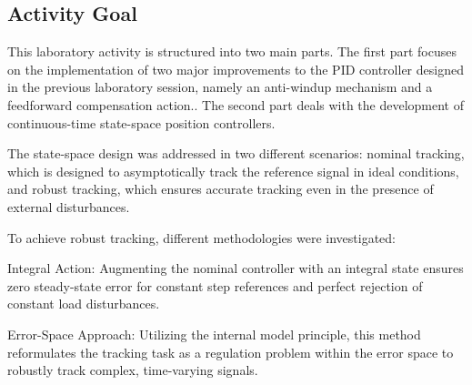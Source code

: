 \subsection{Activity Goal}
This laboratory activity is structured into two main parts. The first part focuses on the implementation of two major improvements to the PID controller designed in the previous laboratory session, namely an anti-windup mechanism and a feedforward compensation action.. The second part deals with the development of continuous-time state-space position controllers.

The state-space design was addressed in two different scenarios: nominal tracking, which is designed to asymptotically track the reference signal in ideal conditions, and robust tracking, which ensures accurate tracking even in the presence of external disturbances.

To achieve robust tracking, different methodologies were investigated:

Integral Action: Augmenting the nominal controller with an integral state ensures zero steady-state error for constant step references and perfect rejection of constant load disturbances.

Error-Space Approach: Utilizing the internal model principle, this method reformulates the tracking task as a regulation problem within the error space to robustly track complex, time-varying signals.





